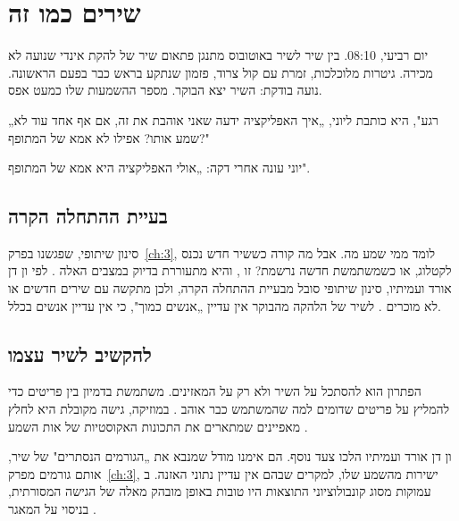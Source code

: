 
\chapter{שירים כמו זה}\label{ch:4}

\begin{scene}
יום רביעי, 08:10. בין שיר לשיר באוטובוס מתנגן פתאום שיר של להקת אינדי שנועה לא מכירה. גיטרות מלוכלכות, זמרת עם קול צרוד, פזמון שנתקע בראש כבר בפעם הראשונה. נועה בודקת: השיר יצא הבוקר. מספר ההשמעות שלו כמעט אפס.

„רגע", היא כותבת ליוני, „איך האפליקציה ידעה שאני אוהבת את זה, אם אף אחד עוד לא שמע אותו? אפילו לא אמא של המתופף?"

יוני עונה אחרי דקה: „אולי האפליקציה היא אמא של המתופף".
\end{scene}

\section{בעיית ההתחלה הקרה}

סינון שיתופי, שפגשנו בפרק~\ref{ch:3}, לומד ממי שמע מה. אבל מה קורה כששיר חדש נכנס לקטלוג, או כשמשתמשת חדשה נרשמת? זו , והיא מתעוררת בדיוק במצבים האלה \cite{schedl2018current}. לפי ון דן אורד ועמיתיו, סינון שיתופי סובל מבעיית ההתחלה הקרה, ולכן מתקשה עם שירים חדשים או לא מוכרים \cite{vandenoord2013deep}. לשיר של הלהקה מהבוקר אין עדיין „אנשים כמוך", כי אין עדיין אנשים בכלל.

\section{להקשיב לשיר עצמו}

הפתרון הוא להסתכל על השיר ולא רק על המאזינים.  משתמשת בדמיון בין פריטים כדי להמליץ על פריטים שדומים למה שהמשתמש כבר אוהב \cite{google2026candidate}. במוזיקה, גישה מקובלת היא לחלץ מאפיינים שמתארים את התכונות האקוסטיות של אות השמע \cite{schedl2018current}.

ון דן אורד ועמיתיו הלכו צעד נוסף. הם אימנו מודל שמנבא את „הגורמים הנסתרים" של שיר, אותם גורמים מפרק~\ref{ch:3}, ישירות מהשמע שלו, למקרים שבהם אין עדיין נתוני האזנה. ב עמוקות מסוג קונבולוציוני התוצאות היו טובות באופן מובהק מאלה של הגישה המסורתית, בניסוי על המאגר  \cite{vandenoord2013deep}.

